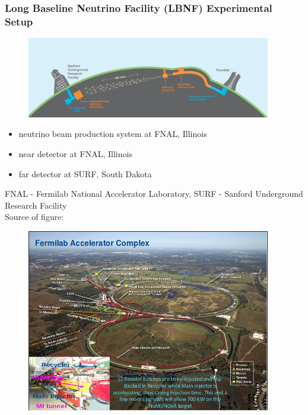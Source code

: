\begin{frame}\frametitle{Long Baseline Neutrino Facility (LBNF) Experimental Setup}
\scriptsize
\begin{figure}
\label{fig:LBNF_overallScheme}
\centering
\includegraphics[width=0.95\textwidth, keepaspectratio=true]{figs/LBNF_overallScheme.png} 
\end{figure}
\begin{itemize}
  \item neutrino beam production system at FNAL, Illinois 
  \item near detector at FNAL, Illinois 
  \item far detector at SURF, South Dakota
\end{itemize}
\tiny
FNAL - Fermilab National Accelerator Laboratory, SURF - Sanford Underground Research Facility\\
Source of figure: \cite{ref_LBNFweb} 
\end{frame}

\begin{frame}
\begin{figure}
\label{fig:LBNF_FermilabAccComplex}
\centering
\includegraphics[width=0.95\textwidth, keepaspectratio=true]{figs/FermilabAccelerator.png}
\end{figure}
\end{frame}

